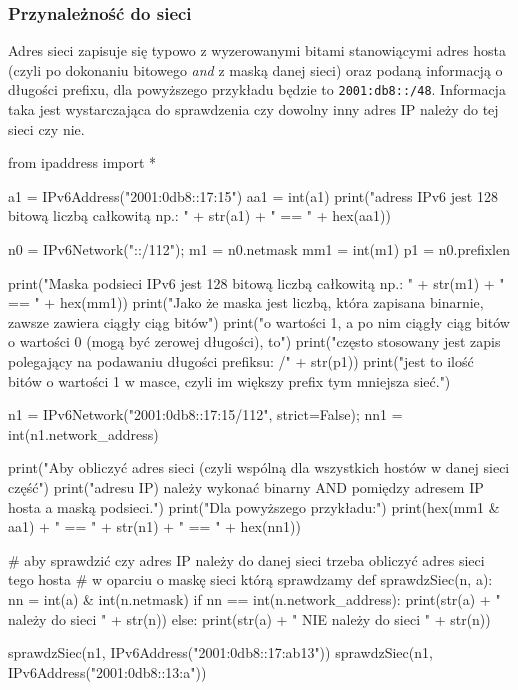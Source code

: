 \documentclass{pdfBooklets}
\begin{document}
\subsubsection{Przynależność do sieci}
Adres sieci zapisuje się typowo z wyzerowanymi bitami stanowiącymi adres hosta (czyli po dokonaniu bitowego \emph{and} z maską danej sieci) oraz podaną informacją o długości prefixu, dla powyższego przykładu będzie to \Verb$2001:db8::/48$. Informacja taka jest wystarczająca do sprawdzenia czy dowolny inny adres IP należy do tej sieci czy nie.

\label{czy_w_sieci_kod}\begin{CodeFrame*}[python][fontsize=\footnotesize]{}
from ipaddress import *

a1  = IPv6Address("2001:0db8::17:15")
aa1 = int(a1)
print("adress IPv6 jest 128 bitową liczbą całkowitą np.: " + str(a1) + " == " + hex(aa1))

n0  = IPv6Network("::/112");
m1  = n0.netmask
mm1 = int(m1)
p1  = n0.prefixlen

print("Maska podsieci IPv6 jest 128 bitową liczbą całkowitą np.: " + str(m1) + " == " + hex(mm1))
print("Jako że maska jest liczbą, która zapisana binarnie, zawsze zawiera ciągły ciąg bitów")
print("o wartości 1, a po nim ciągły ciąg bitów o wartości 0 (mogą być zerowej długości), to")
print("często stosowany jest zapis polegający na podawaniu długości prefiksu: /" + str(p1))
print("jest to ilość bitów o wartości 1 w masce, czyli im większy prefix tym mniejsza sieć.")

n1  = IPv6Network("2001:0db8::17:15/112", strict=False);
nn1 = int(n1.network_address)

print("Aby obliczyć adres sieci (czyli wspólną dla wszystkich hostów w danej sieci część")
print("adresu IP) należy wykonać binarny AND pomiędzy adresem IP hosta a maską podsieci.")
print("Dla powyższego przykładu:")
print(hex(mm1 & aa1) + " == " + str(n1) + " == " + hex(nn1))

# aby sprawdzić czy adres IP należy do danej sieci trzeba obliczyć adres sieci tego hosta
# w oparciu o maskę sieci którą sprawdzamy
def sprawdzSiec(n, a):
	nn = int(a) & int(n.netmask)
	if nn == int(n.network_address):
		print(str(a) + " należy do sieci " + str(n))
	else:
		print(str(a) + " NIE należy do sieci " + str(n))

sprawdzSiec(n1, IPv6Address("2001:0db8::17:ab13"))
sprawdzSiec(n1, IPv6Address("2001:0db8::13:a"))
\end{CodeFrame*}

\end{document}
